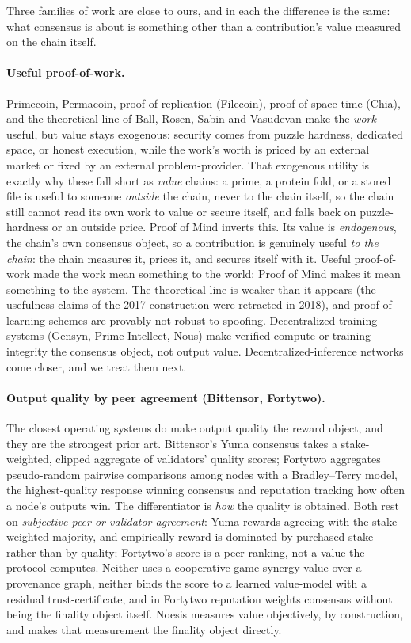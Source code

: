 \documentclass[10pt]{article}
\begin{document}
Three families of work are close to ours, and in each the difference is the same: what consensus is
about is something other than a contribution's value measured on the chain itself.

\paragraph{Useful proof-of-work.} Primecoin, Permacoin, proof-of-replication (Filecoin), proof of
space-time (Chia), and the theoretical line of Ball, Rosen, Sabin and Vasudevan make the \emph{work}
useful, but value stays exogenous: security comes from puzzle hardness, dedicated space, or honest
execution, while the work's worth is priced by an external market or fixed by an external
problem-provider. That exogenous utility is exactly why these fall short as \emph{value} chains: a
prime, a protein fold, or a stored file is useful to someone \emph{outside} the chain, never to the
chain itself, so the chain still cannot read its own work to value or secure itself, and falls back on
puzzle-hardness or an outside price. Proof of Mind inverts this. Its value is \emph{endogenous}, the
chain's own consensus object, so a contribution is genuinely useful \emph{to the chain}: the chain
measures it, prices it, and secures itself with it. Useful proof-of-work made the work mean something to
the world; Proof of Mind makes it mean something to the system. The theoretical line is weaker than it appears (the usefulness claims of the 2017
construction were retracted in 2018), and proof-of-learning schemes are provably not robust to spoofing.
Decentralized-training systems (Gensyn, Prime Intellect, Nous) make verified compute or
training-integrity the consensus object, not output value. Decentralized-inference networks come
closer, and we treat them next.

\paragraph{Output quality by peer agreement (Bittensor, Fortytwo).} The closest operating systems do
make output quality the reward object, and they are the strongest prior art. Bittensor's Yuma consensus
takes a stake-weighted, clipped aggregate of validators' quality scores; Fortytwo aggregates
pseudo-random pairwise comparisons among nodes with a Bradley--Terry model, the highest-quality response
winning consensus and reputation tracking how often a node's outputs win. The differentiator is
\emph{how} the quality is obtained. Both rest on \emph{subjective peer or validator agreement}: Yuma
rewards agreeing with the stake-weighted majority, and empirically reward is dominated by purchased
stake rather than by quality; Fortytwo's score is a peer ranking, not a value the protocol computes.
Neither uses a cooperative-game synergy value over a provenance graph, neither binds the score to a
learned value-model with a residual trust-certificate, and in Fortytwo reputation weights consensus
without being the finality object itself. Noesis measures value objectively, by construction, and makes
that measurement the finality object directly.
\end{document}
